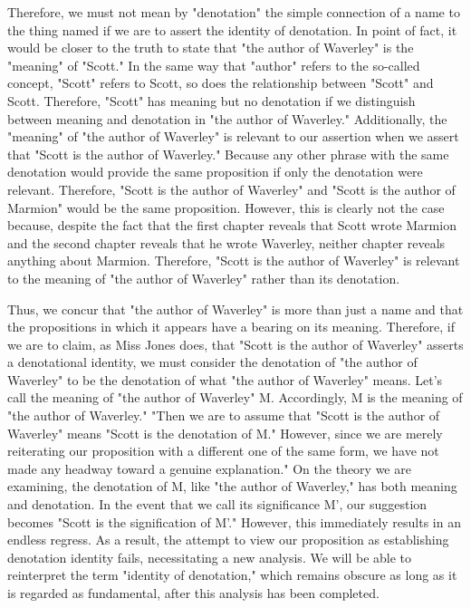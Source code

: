 \documentclass[a4paper,12pt]{book}[2004/02/16]
\theoremstyle{ilemma}
\theoremstyle{itheorem}
\theoremstyle{iother}
\theoremstyle{icorollary}
\theoremstyle{numcorollary}
\theoremstyle{idefinition}
\begin{document}
Therefore, we must not mean by "denotation" the simple connection of a name to the thing named if we are to assert the identity of denotation. In point of fact, it would be closer to the truth to state that "the author of Waverley" is the "meaning" of "Scott." In the same way that "author" refers to the so-called concept, "Scott" refers to Scott, so does the relationship between "Scott" and Scott. Therefore, "Scott" has meaning but no denotation if we distinguish between meaning and denotation in "the author of Waverley." Additionally, the "meaning" of "the author of Waverley" is relevant to our assertion when we assert that "Scott is the author of Waverley."
Because any other phrase with the same denotation would provide the same proposition if only the denotation were relevant. Therefore, "Scott is the author of Waverley" and "Scott is the author of Marmion" would be the same proposition. However, this is clearly not the case because, despite the fact that the first chapter reveals that Scott wrote Marmion and the second chapter reveals that he wrote Waverley, neither chapter reveals anything about Marmion. Therefore, "Scott is the author of Waverley" is relevant to the meaning of "the author of Waverley" rather than its denotation.

Thus, we concur that "the author of Waverley" is more than just a name and that the propositions in which it appears have a bearing on its meaning.
Therefore, if we are to claim, as Miss Jones does, that "Scott is the author of Waverley" asserts a denotational identity, we must consider the denotation of "the author of Waverley" to be the denotation of what "the author of Waverley" means. Let's call the meaning of "the author of Waverley" M. Accordingly, M is the meaning of "the author of Waverley."
"Then we are to assume that "Scott is the author of Waverley" means "Scott is the denotation of M." However, since we are merely reiterating our proposition with a different one of the same form, we have not made any headway toward a genuine explanation." On the theory we are examining, the denotation of M, like "the author of Waverley," has both meaning and denotation. In the event that we call its significance M', our suggestion becomes
"Scott is the signification of M'." However, this immediately results in an endless regress. As a result, the attempt to view our proposition as establishing denotation identity fails, necessitating a new analysis. We will be able to reinterpret the term "identity of denotation," which remains obscure as long as it is regarded as fundamental, after this analysis has been completed.
\end{document}
